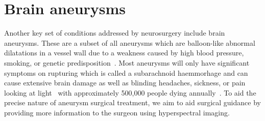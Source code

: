 \section{Brain aneurysms}\label{sec:aneurysms}
Another key set of conditions addressed by neurosurgery include brain aneurysms. These are a subset of all aneurysms which are balloon-like abnormal dilatations in a vessel wall due to a weakness caused by high blood pressure, smoking, or genetic predisposition~\citep{NationalHealthService2022}. Most aneurysms will only have significant symptoms on rupturing which is called a subarachnoid haemmorhage and can cause extensive brain damage as well as blinding headaches, sickness, or pain looking at light~\citep{NationalHealthService2022} with approximately 500,000 people dying annually~\citep{Toth2018}. To aid the precise nature of aneurysm surgical treatment, we aim to aid surgical guidance by providing more information to the surgeon using hyperspectral imaging. 


